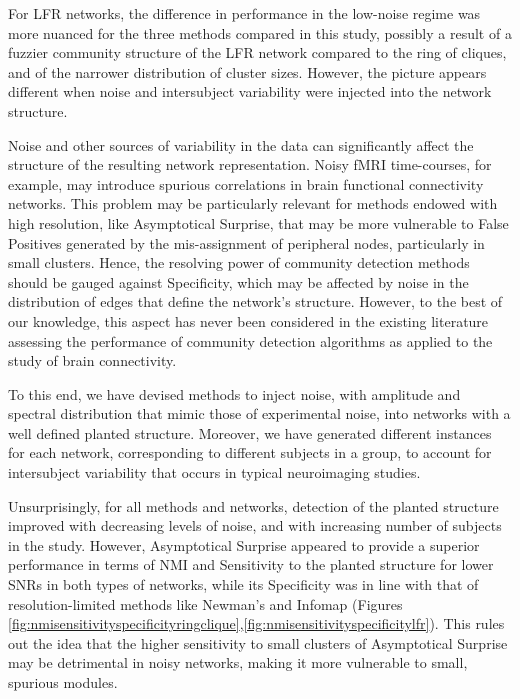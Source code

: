 For LFR networks, the difference in performance in the low-noise regime was more nuanced for the three methods compared in this study, possibly a result of a fuzzier community structure of the LFR network compared to the ring of cliques, and of the narrower distribution of cluster sizes. However, the picture appears different when noise and intersubject variability were injected into the network structure.

Noise and other sources of variability in the data can significantly affect the structure of the resulting network representation.
Noisy fMRI time-courses, for example, may introduce spurious correlations in brain functional connectivity networks.
This problem may be particularly relevant for methods endowed with high resolution, like Asymptotical Surprise, that may be more vulnerable to False Positives generated by the mis-assignment of peripheral nodes, particularly in small clusters. Hence, the resolving power of community detection methods should be gauged against Specificity, which may be affected by noise in the distribution of edges that define the network's structure.
However, to the best of our knowledge, this aspect has never been considered in the existing literature assessing the performance of community detection algorithms as applied to the study of brain connectivity.

To this end, we have devised methods to inject noise, with amplitude and spectral distribution that mimic those of experimental noise, into networks with a well defined planted structure. Moreover, we have generated different instances for each network, corresponding to different subjects in a group, to account for intersubject variability that occurs in typical neuroimaging studies. 

Unsurprisingly, for all methods and networks, detection of the planted structure improved with decreasing levels of noise, and with increasing number of subjects in the study.
However, Asymptotical Surprise appeared to provide a superior performance in terms of NMI and Sensitivity to the planted structure for lower SNRs in both types of networks, while its Specificity was in line with that of resolution-limited methods like Newman's and Infomap (Figures \ref{fig:nmisensitivityspecificityringclique},\ref{fig:nmisensitivityspecificitylfr}).
This rules out the idea that the higher sensitivity to small clusters of Asymptotical Surprise may be detrimental in noisy networks, making it more vulnerable to small, spurious modules.

